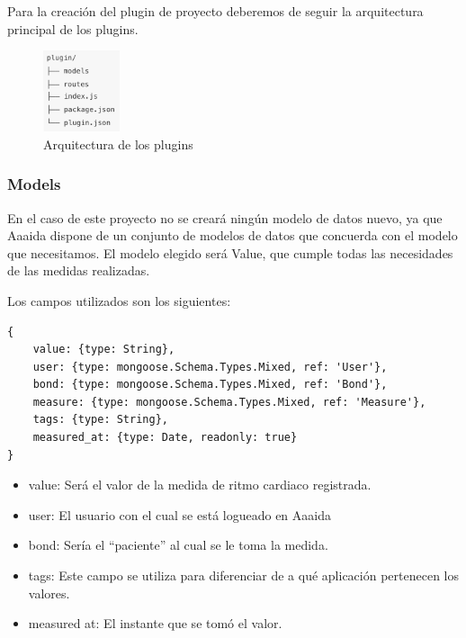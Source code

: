 Para la creación del plugin de proyecto deberemos de seguir la arquitectura principal de los plugins.


\begin{figure}[htb]
\begin{center}
\includegraphics[width=0.20\textwidth]{./setup/arc}
\caption{Arquitectura de los plugins}
\end{center}
\end{figure}

\subsubsection{Models}

En el caso de este proyecto no se creará ningún modelo de datos nuevo, ya que Aaaida dispone de un conjunto de modelos de datos que concuerda con el modelo que necesitamos. El modelo elegido será Value, que cumple todas las necesidades de las medidas realizadas.

Los campos utilizados son los siguientes:

\begin{verbatim}
{
    value: {type: String},
    user: {type: mongoose.Schema.Types.Mixed, ref: 'User'},
    bond: {type: mongoose.Schema.Types.Mixed, ref: 'Bond'},
    measure: {type: mongoose.Schema.Types.Mixed, ref: 'Measure'},
    tags: {type: String},
    measured_at: {type: Date, readonly: true}
}
\end{verbatim}
\pagebreak

\begin{itemize}
\item value: Será el valor de la medida de ritmo cardiaco registrada. 
\item user: El usuario con el cual se está logueado en Aaaida
\item bond: Sería el “paciente” al cual se le toma la medida.
\item tags: Este campo se utiliza para diferenciar de a qué aplicación pertenecen los valores.  
\item measured at: El instante que se tomó el valor. 
\end{itemize}

